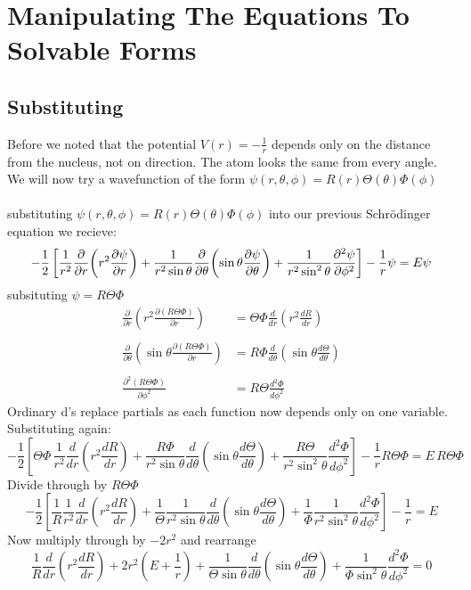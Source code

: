 \documentclass{article}
\begin{document}
 \section{Manipulating The Equations To Solvable Forms}
  \subsection{Substituting}
 Before we noted that the potential $V(r) = -\frac{1}{r}$ depends only on the distance from the nucleus, not on direction. The atom looks the same from every angle. We will now try a wavefunction of the form $\psi(r,\theta,\phi) = R(r)\Theta(\theta)\Phi(\phi)$\\\\
 substituting $\psi(r,\theta,\phi) = R(r)\Theta(\theta)\Phi(\phi)$ into our previous Schrödinger equation we recieve:
\[
      -\frac{1}{2}\left[
    \frac{1}{r^2}\frac{\partial}{\partial r}\!\left(r^2\frac{\partial\psi}{\partial r}\right)
    + \frac{1}{r^2\sin\theta}\frac{\partial}{\partial\theta}\!\left(\sin\theta\frac{\partial\psi}{\partial\theta}\right)
    + \frac{1}{r^2\sin^2\theta}\frac{\partial^2\psi}{\partial\phi^2}
  \right]
  - \frac{1}{r}\psi = E\psi\\
\]
subsituting $\psi = R\Theta\Phi$
\begin{align*}
    \frac{\partial}{\partial r} (r^2 \frac{\partial(R\Theta\Phi)}{\partial r}) &= \Theta\Phi\frac{d}{dr}(r^2\frac{dR}{dr})\\\\
    \frac{\partial}{\partial \theta} (\sin\theta \frac{\partial(R\Theta\Phi)}{\partial r}) &= R\Phi\frac{d}{d\theta}(\sin\theta\frac{d\Theta}{d\theta})\\\\
    \frac{\partial^2(R\Theta\Phi)}{\partial\phi^2} &= R\Theta\frac{d^2\Phi}{d\phi^2} 
\end{align*}
Ordinary d's replace partials as each function now depends only on one variable. Substituting again:
\[
  -\frac{1}{2}\left[
    \Theta\Phi\,\frac{1}{r^2}\frac{d}{dr}\!\left(r^2\frac{dR}{dr}\right)
    + \frac{R\Phi}{r^2\sin\theta}\frac{d}{d\theta}\!\left(\sin\theta\frac{d\Theta}{d\theta}\right)
    + \frac{R\Theta}{r^2\sin^2\theta}\frac{d^2\Phi}{d\phi^2}
  \right]
  - \frac{1}{r}R\Theta\Phi
  = E\,R\Theta\Phi
\]
\newpage
Divide through by $R\Theta\Phi$
\[
  -\frac{1}{2}\left[
    \frac{1}{R}\frac{1}{r^2}\frac{d}{dr}\!\left(r^2\frac{dR}{dr}\right)
    + \frac{1}{\Theta}\frac{1}{r^2\sin\theta}\frac{d}{d\theta}\!\left(\sin\theta\frac{d\Theta}{d\theta}\right)
    + \frac{1}{\Phi}\frac{1}{r^2\sin^2\theta}\frac{d^2\Phi}{d\phi^2}
  \right]
  - \frac{1}{r} = E
\]
Now multiply through by $-2r^2$ and rearrange
\[
  \frac{1}{R}\frac{d}{dr}\!\left(r^2\frac{dR}{dr}\right)
  + 2r^2\left(E + \frac{1}{r}\right)
  + \frac{1}{\Theta\sin\theta}\frac{d}{d\theta}\!\left(\sin\theta\frac{d\Theta}{d\theta}\right)
  + \frac{1}{\Phi\sin^2\theta}\frac{d^2\Phi}{d\phi^2}
  = 0
\]
\end{document}
